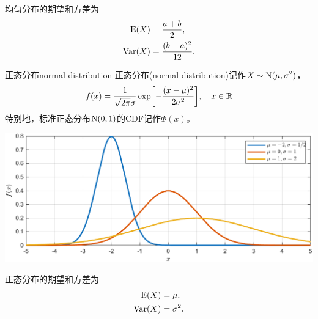 \begin{corollary}
	均匀分布的期望和方差为
	\begin{subequations}
		\begin{align}
			\operatorname{E}(X)&=\frac{a+b}2,\\
			\operatorname{Var}(X)&=\frac{(b-a)^2}{12}.
		\end{align}
	\end{subequations}
\end{corollary}
\begin{definition}{正态分布}{normal distribution}
	正态分布(normal distribution)记作$X\sim\operatorname{N}(\mu,\sigma^2)$，%
	\begin{equation}
		f(x)=\frac1{\sqrt{2\pi}\sigma}\exp\biggl[-\frac{(x-\mu)^2}{2\sigma^2}\biggr],\quad x\in\mathbb R
	\end{equation}
	特别地，标准正态分布$\operatorname{N}(0,1)$的CDF记作$\Phi(x)$。
	\begin{center}
		\includegraphics[width=.9\textwidth]{figures/pdf_normal.pdf}
	\end{center}
\end{definition}
\begin{corollary}
	正态分布的期望和方差为
	\begin{subequations}
		\begin{align}
			\operatorname{E}(X)&=\mu,\\
			\operatorname{Var}(X)&=\sigma^2.
		\end{align}
	\end{subequations}
\end{corollary}
